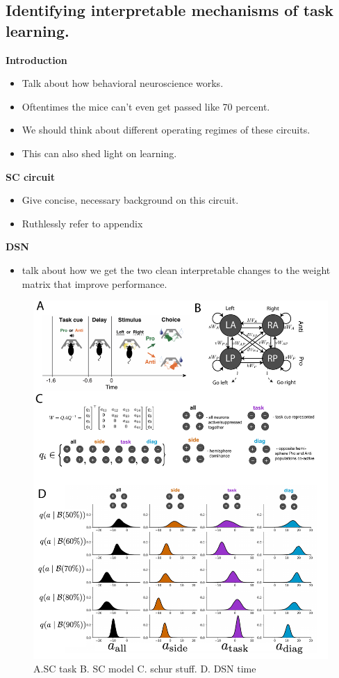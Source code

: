 \documentclass[11pt]{article}
\begin{document}
\subsection{Identifying interpretable mechanisms of task learning.}
\textbf{Introduction}
\begin{itemize}
\item Talk about how behavioral neuroscience works.
\item Oftentimes the mice can't even get passed like 70 percent.
\item We should think about different operating regimes of these circuits.
\item This can also shed light on learning.
\end{itemize}

\textbf{SC circuit}
\begin{itemize}
\item Give concise, necessary background on this circuit.
\item Ruthlessly refer to appendix
\end{itemize}

\textbf{DSN}
\begin{itemize}
\item talk about how we get the two clean interpretable changes to the weight matrix that improve performance. 
\end{itemize}

\begin{figure}
\begin{center}
\includegraphics[scale=0.4]{figs/fig4/fig4.pdf}
\end{center}
\caption{A.SC task B. SC model C. schur stuff. D. DSN time}
\end{figure}
\end{document}
